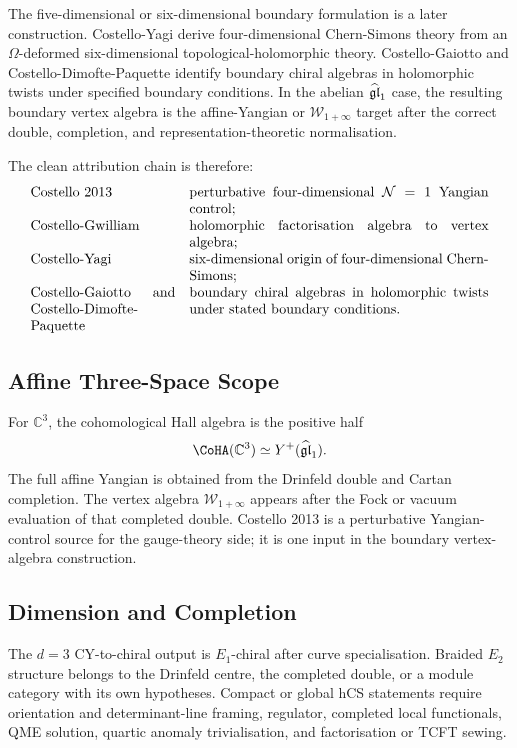 The five-dimensional or six-dimensional boundary formulation is a later
construction.  Costello-Yagi derive four-dimensional Chern-Simons theory
from an \(\Omega\)-deformed six-dimensional topological-holomorphic
theory.  Costello-Gaiotto and Costello-Dimofte-Paquette identify
boundary chiral algebras in holomorphic twists under specified boundary
conditions.  In the abelian \(\widehat{\mathfrak{gl}}_1\) case, the resulting boundary
vertex algebra is the affine-Yangian or \(\mathcal W_{1+\infty}\) target
after the correct double, completion, and representation-theoretic
normalisation.

The clean attribution chain is therefore:
\[
\begin{array}{p{0.30\linewidth}p{0.62\linewidth}}
Costello 2013 &
perturbative four-dimensional \(\mathcal N=1\) Yangian control;\\
Costello-Gwilliam &
holomorphic factorisation algebra to vertex algebra;\\
Costello-Yagi &
six-dimensional origin of four-dimensional Chern-Simons;\\
Costello-Gaiotto and Costello-Dimofte-Paquette &
boundary chiral algebras in holomorphic twists under stated boundary
conditions.
\end{array}
\]

\subsection{Affine Three-Space Scope}

For \(\mathbb C^3\), the cohomological Hall algebra is the positive
half
\[
  \CoHA(\mathbb C^3)\simeq Y^+(\gghone).
\]
The full affine Yangian is obtained from the Drinfeld double and Cartan
completion.  The vertex algebra \(\mathcal W_{1+\infty}\) appears after
the Fock or vacuum evaluation of that completed double.  Costello 2013
is a perturbative Yangian-control source for the gauge-theory side; it
is one input in the boundary vertex-algebra construction.

\subsection{Dimension and Completion}

The \(d=3\) CY-to-chiral output is \(E_1\)-chiral after curve
specialisation.  Braided \(E_2\) structure belongs to the Drinfeld
centre, the completed double, or a module category with its own
hypotheses.  Compact or global hCS statements require orientation and
determinant-line framing, regulator, completed local functionals, QME
solution, quartic anomaly trivialisation, and factorisation or TCFT
sewing.

